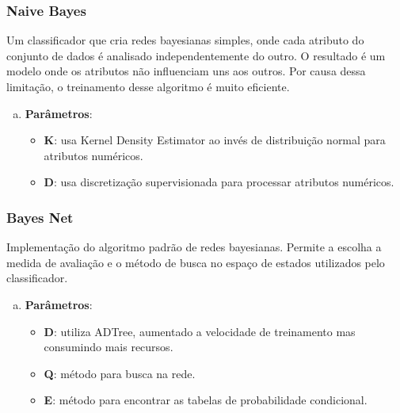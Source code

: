 \subsubsection{Naive Bayes}

Um classificador que cria redes bayesianas simples, onde cada atributo do conjunto de dados é analisado independentemente do outro. O resultado é um modelo onde os atributos não influenciam uns aos outros. Por causa dessa limitação, o treinamento desse algoritmo é muito eficiente.

\begin{enumerate}[a)]
    \item \textbf{Parâmetros}:
        \begin{itemize}

            \item \textbf{K}: usa Kernel Density Estimator ao invés de distribuição normal para atributos numéricos.

            \item \textbf{D}: usa discretização supervisionada para processar atributos numéricos.
        \end{itemize}
\end{enumerate}

\subsubsection{Bayes Net}

Implementação do algoritmo padrão de redes bayesianas. Permite a escolha a medida de avaliação e o método de busca no espaço de estados utilizados pelo classificador.

\begin{enumerate}[a)]
    \item \textbf{Parâmetros}:
        \begin{itemize}

            \item \textbf{D}: utiliza ADTree, aumentado a velocidade de treinamento mas consumindo mais recursos.

            \item \textbf{Q}: método para busca na rede.

            \item \textbf{E}: método para encontrar as tabelas de probabilidade condicional.
        \end{itemize}
\end{enumerate}

